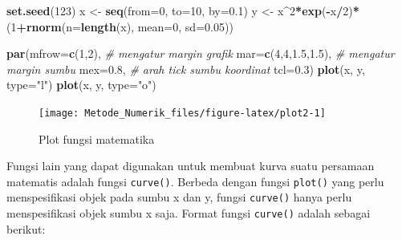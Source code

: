 \documentclass[
]{book}
\newenvironment{Shaded}{\begin{snugshade}}{\end{snugshade}}
\newcommand{\AttributeTok}[1]{\textcolor[rgb]{0.13,0.29,0.53}{#1}}
\newcommand{\CommentTok}[1]{\textcolor[rgb]{0.56,0.35,0.01}{\textit{#1}}}
\newcommand{\DecValTok}[1]{\textcolor[rgb]{0.00,0.00,0.81}{#1}}
\newcommand{\FloatTok}[1]{\textcolor[rgb]{0.00,0.00,0.81}{#1}}
\newcommand{\FunctionTok}[1]{\textcolor[rgb]{0.13,0.29,0.53}{\textbf{#1}}}
\newcommand{\NormalTok}[1]{#1}
\newcommand{\OtherTok}[1]{\textcolor[rgb]{0.56,0.35,0.01}{#1}}
\newcommand{\SpecialCharTok}[1]{\textcolor[rgb]{0.81,0.36,0.00}{\textbf{#1}}}
\newcommand{\StringTok}[1]{\textcolor[rgb]{0.31,0.60,0.02}{#1}}
\theoremstyle{definition}
\theoremstyle{definition}
\theoremstyle{definition}
\theoremstyle{definition}
\theoremstyle{remark}
\begin{document}
\begin{Shaded}
\begin{Highlighting}[]
\FunctionTok{set.seed}\NormalTok{(}\DecValTok{123}\NormalTok{)}
\NormalTok{x }\OtherTok{\textless{}{-}} \FunctionTok{seq}\NormalTok{(}\AttributeTok{from=}\DecValTok{0}\NormalTok{, }\AttributeTok{to=}\DecValTok{10}\NormalTok{, }\AttributeTok{by=}\FloatTok{0.1}\NormalTok{)}
\NormalTok{y }\OtherTok{\textless{}{-}}\NormalTok{ x}\SpecialCharTok{\^{}}\DecValTok{2}\SpecialCharTok{*}\FunctionTok{exp}\NormalTok{(}\SpecialCharTok{{-}}\NormalTok{x}\SpecialCharTok{/}\DecValTok{2}\NormalTok{)}\SpecialCharTok{*}\NormalTok{(}\DecValTok{1}\SpecialCharTok{+}\FunctionTok{rnorm}\NormalTok{(}\AttributeTok{n=}\FunctionTok{length}\NormalTok{(x), }\AttributeTok{mean=}\DecValTok{0}\NormalTok{, }\AttributeTok{sd=}\FloatTok{0.05}\NormalTok{))}
\end{Highlighting}
\end{Shaded}

\begin{Shaded}
\begin{Highlighting}[]
\FunctionTok{par}\NormalTok{(}\AttributeTok{mfrow=}\FunctionTok{c}\NormalTok{(}\DecValTok{1}\NormalTok{,}\DecValTok{2}\NormalTok{),}
    \CommentTok{\# mengatur margin grafik}
    \AttributeTok{mar=}\FunctionTok{c}\NormalTok{(}\DecValTok{4}\NormalTok{,}\DecValTok{4}\NormalTok{,}\FloatTok{1.5}\NormalTok{,}\FloatTok{1.5}\NormalTok{),}
    \CommentTok{\# mengatur margin sumbu}
    \AttributeTok{mex=}\FloatTok{0.8}\NormalTok{,}
    \CommentTok{\# arah tick sumbu koordinat}
    \AttributeTok{tcl=}\FloatTok{0.3}\NormalTok{)}
\FunctionTok{plot}\NormalTok{(x, y, }\AttributeTok{type=}\StringTok{"l"}\NormalTok{)}
\FunctionTok{plot}\NormalTok{(x, y, }\AttributeTok{type=}\StringTok{"o"}\NormalTok{)}
\end{Highlighting}
\end{Shaded}

\begin{figure}

{\centering \texttt{[image: Metode\_Numerik\_files/figure-latex/plot2-1]} 

}

\caption{Plot fungsi matematika}\label{fig:plot2}
\end{figure}

Fungsi lain yang dapat digunakan untuk membuat kurva suatu persamaan matematis adalah fungsi \texttt{curve()}. Berbeda dengan fungsi \texttt{plot()} yang perlu menspesifikasi objek pada sumbu x dan y, fungsi \texttt{curve()} hanya perlu menspesifikasi objek sumbu x saja. Format fungsi \texttt{curve()} adalah sebagai berikut:
\end{document}
